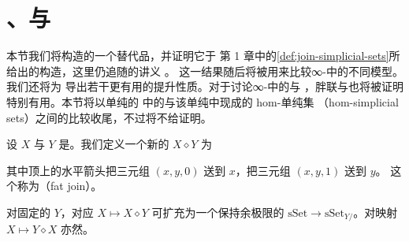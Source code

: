 \section{\trFatJoin{}、\trFatSlice{}与\trMappingSpace{}}
\label{sec:fat-joins-fat-slices-mapping-spaces}

本节我们将构造\trJoin{}的一个替代品，并证明它\trJoyalEquivalence{}于%
第 1 章中的\cref{def:join-simplicial-sets}所给出的构造，这里仍追随\trRezk{}的讲义 \cite{Rez20}。
这一结果随后将被用来比较∞-\trCategory{}中\trMappingSpace{}的不同模型。我们还将为%
\trIsofibration{}导出若干更有用的提升性质。对于讨论∞-\trCategory{}中的\trLimit{}与%
\trColimit{}，胖联与\trFatSlice{}也将被证明特别有用。本节将以单纯\trCategory{}的%
\trCoherentNerve{}中的\trMappingSpace{}与该单纯\trCategory{}中现成的 hom-单纯集%
（hom-simplicial sets）之间的比较收尾，不过将不给证明。

\begin{definition}\label{def:fat-join}
设 $X$ 与 $Y$ 是\trSimplicialSets{}。我们定义一个新的\trSimplicialSet{} $X \diamond Y$
为\trPushout{}%
\begin{center}
\end{center}
其中顶上的水平箭头把三元组 $(x, y, 0)$ 送到 $x$，把三元组 $(x, y, 1)$ 送到 $y$。
这个\trSimplicialSet{}称为\emph{\trFatJoin{}}（fat join）。
\end{definition}

\begin{lemma}\label{lem:fat-join-colimit}
对固定的 $Y$，对应 $X \mapsto X \diamond Y$ 可扩充为一个保持余极限的\trFunctor{}%
$\mathrm{sSet} \to \mathrm{sSet}_{Y/}$。对映射 $X \mapsto Y \diamond X$ 亦然。
\end{lemma}

